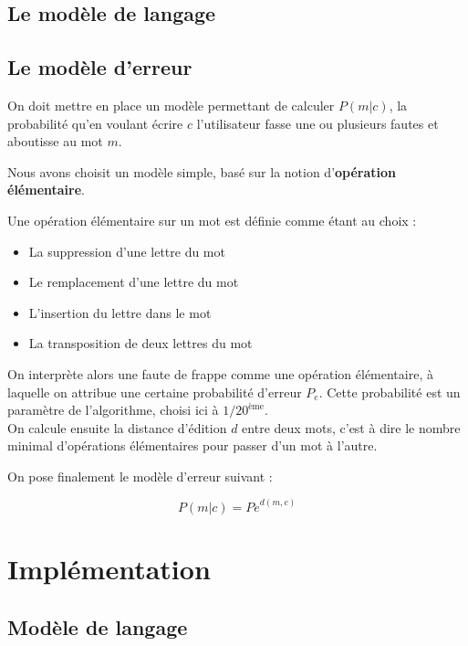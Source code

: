 \documentclass[10pt,a4paper]{article}
\begin{document}
\subsection{Le modèle de langage}



\subsection{Le modèle d'erreur}

On doit mettre en place un modèle permettant de calculer $P(m|c)$, la probabilité qu'en voulant écrire $c$ l'utilisateur fasse une ou plusieurs fautes et aboutisse au mot $m$.

Nous avons choisit un modèle simple, basé sur la notion d'\textbf{opération élémentaire}.

Une opération élémentaire sur un mot est définie comme étant au choix : \\

\begin{itemize}
\item La suppression d'une lettre du mot
\item Le remplacement d'une lettre du mot
\item L'insertion du lettre dans le mot
\item La transposition de deux lettres du mot
\end{itemize}

On interprète alors une faute de frappe comme une opération élémentaire, à laquelle on attribue une certaine probabilité d'erreur $P_e$. Cette probabilité est un paramètre de l'algorithme, choisi ici à $1/20^{\text{ème}}$.\\

On calcule ensuite la distance d'édition $d$ entre deux mots, c'est à dire le nombre minimal d'opérations élémentaires pour passer d'un mot à l'autre.

On pose finalement le modèle d'erreur suivant : 

\begin{equation}
P(m|c) = {Pe}^{d(m,c)}
\end{equation}

\section{Implémentation}
\subsection{Modèle de langage}
\end{document}
